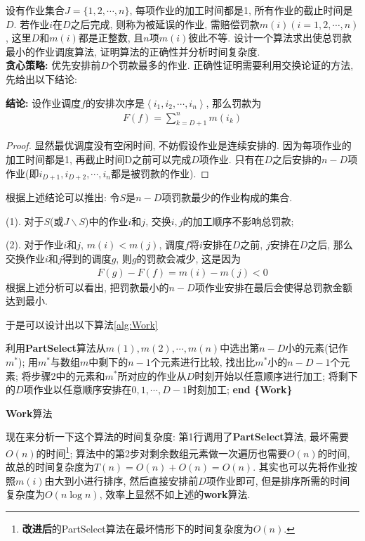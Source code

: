\documentclass{article}
\begin{document}
\begin{homeworkProblem}
	设有作业集合$J=\{1,2,\cdots,n\}$, 每项作业的加工时间都是1, 所有作业的截止时间是$D$. 若作业$i$在$D$之后完成, 则称为被延误的作业, 需赔偿罚款$m(i)(i=1,2,\cdots,n)$, 这里$D$和$m(i)$都是正整数, 且$n$项$m(i)$彼此不等. 设计一个算法求出使总罚款最小的作业调度算法, 证明算法的正确性并分析时间复杂度.
	\\

	\solution \textbf{贪心策略:} 优先安排前$D$个罚款最多的作业. 正确性证明需要利用交换论证的方法, 先给出以下结论:

	\textbf{结论:} 设作业调度$f$的安排次序是$\left< i_1,i_2,\cdots ,i_n \right> $, 那么罚款为
	\begin{align}
		F\left( f \right) =\sum_{k=D+1}^n{m\left( i_k \right)}
	\end{align}
	\begin{proof}
		显然最优调度没有空闲时间, 不妨假设作业是连续安排的. 因为每项作业的加工时间都是1, 再截止时间D之前可以完成$D$项作业. 只有在$D$之后安排的$n-D$项作业(即$i_{D+1},i_{D+2},\cdots,i_{n}$都是被罚款的作业).
	\end{proof}
	根据上述结论可以推出: 令$S$是$n-D$项罚款最少的作业构成的集合.

	(1). 对于$S$(或$J\backslash S$)中的作业$i$和$j$, 交换$i,j$的加工顺序不影响总罚款;

	(2). 对于作业$i$和$j$, $m(i)<m(j)$, 调度$f$将$i$安排在$D$之前, $j$安排在$D$之后, 那么交换作业$i$和$j$得到的调度$g$, 则$g$的罚款会减少, 这是因为
	\begin{align}
		F(g) - F(f) = m(i) - m(j) < 0
	\end{align}
	根据上述分析可以看出, 把罚款最小的$n-D$项作业安排在最后会使得总罚款金额达到最小.

	于是可以设计出以下算法\ref{alg:Work}
	\begin{algorithm}[H]
		\begin{algorithmic}[1]
		\State 利用\textbf{PartSelect}算法从$m(1),m(2),\cdots,m(n)$中选出第$n-D$小的元素(记作$m^{\ast}$);
		\State 用$m^{\ast}$与数组$m$中剩下的$n-1$个元素进行比较, 找出比$m^{\ast}$小的$n-D-1$个元素;
		\State 将步骤2中的元素和$m^{\ast}$所对应的作业从$D$时刻开始以任意顺序进行加工;
		\State 将剩下的$D$项作业以任意顺序安排在$0,1,\cdots,D-1$时刻加工;
		\State \textbf{end \{Work\}}
		\end{algorithmic}
		\caption{\textbf{Work}算法}
		\label{alg:Work}
	\end{algorithm}
	现在来分析一下这个算法的时间复杂度: 第1行调用了\textbf{PartSelect}算法, 最坏需要$O(n)$的时间\footnote{\textbf{改进后}的PartSelect算法在最坏情形下的时间复杂度为$O(n)$.}; 算法中的第2步对剩余数组元素做一次遍历也需要$O(n)$的时间, 故总的时间复杂度为$T(n)=O(n)+O(n)=O(n)$. 其实也可以先将作业按照$m(i)$由大到小进行排序, 然后直接安排前$D$项作业即可, 但是排序所需的时间复杂度为$O(n\log n)$, 效率上显然不如上述的\textbf{work}算法.
	\newpage
\end{homeworkProblem}
\end{document}
